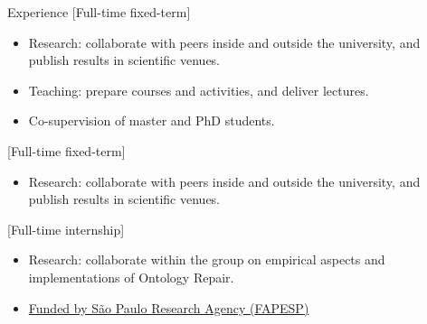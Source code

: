 \begin{rSection}{Experience}
    [Full-time fixed-term]{%
        \begin{itemize}[nosep]
            \item Research: collaborate with peers inside and outside the university, and publish results in scientific venues.
            \item Teaching: prepare courses and activities, and deliver lectures.
            \item Co-supervision of master and PhD students.
        \end{itemize}%
    }

    [Full-time fixed-term]{%
        \begin{itemize}[nosep]
            \item Research: collaborate with peers inside and outside the university, and publish results in scientific venues.
        \end{itemize}%
    }

    [Full-time internship]{%
        \begin{itemize}[nosep]
            \item Research: collaborate within the group on empirical aspects and implementations of Ontology Repair.
            \item \href{https://bv.fapesp.br/en/bolsas/176114/improving-efficiency-of-belief-base-change-in-description-logics-with-modularity-in-ontologies/}{Funded by São Paulo Research Agency ({FAPESP})}
        \end{itemize}%
    }
\end{rSection}
